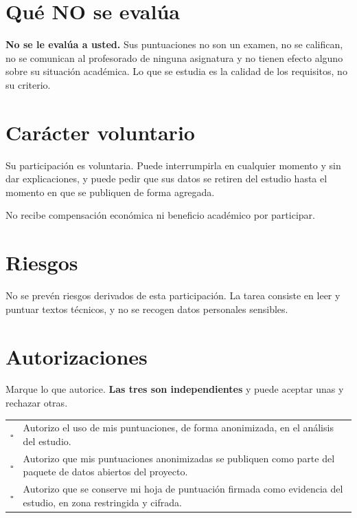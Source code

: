\documentclass[11pt,a4paper]{article}
\newcommand{\casilla}{$\square$}
\begin{document}
\section{Qué NO se evalúa}

\begin{tcolorbox}[colback=grisclaro,colframe=uteqverde,boxrule=0.6pt,arc=2pt]
\textbf{No se le evalúa a usted.} Sus puntuaciones no son un examen, no se
califican, no se comunican al profesorado de ninguna asignatura y no tienen
efecto alguno sobre su situación académica. Lo que se estudia es la calidad de
los requisitos, no su criterio.
\end{tcolorbox}

\section{Carácter voluntario}

Su participación es voluntaria. Puede interrumpirla en cualquier momento y sin
dar explicaciones, y puede pedir que sus datos se retiren del estudio hasta el
momento en que se publiquen de forma agregada.

No recibe compensación económica ni beneficio académico por participar.

\section{Riesgos}

No se prevén riesgos derivados de esta participación. La tarea consiste en leer
y puntuar textos técnicos, y no se recogen datos personales sensibles.

\section{Autorizaciones}

Marque lo que autorice. \textbf{Las tres son independientes} y puede aceptar
unas y rechazar otras.

\vspace{3pt}
\renewcommand{\arraystretch}{1.5}
\begin{tabular}{C{1cm} L{15cm}}
\casilla & Autorizo el uso de mis puntuaciones, de forma anonimizada, en el
análisis del estudio. \\
\casilla & Autorizo que mis puntuaciones anonimizadas se publiquen como parte
del paquete de datos abiertos del proyecto. \\
\casilla & Autorizo que se conserve mi hoja de puntuación firmada como evidencia
del estudio, en zona restringida y cifrada. \\
\end{tabular}
\end{document}
